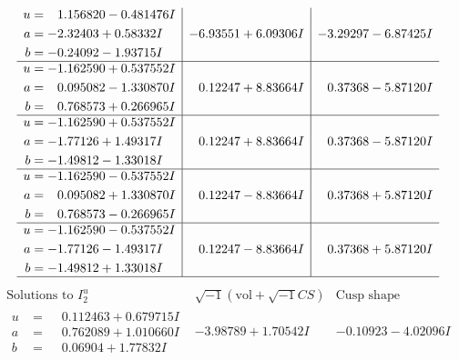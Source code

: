\documentclass[1p]{elsarticle_modified}
\theoremstyle{definition}
\newcommand{\I}{\sqrt{-1}}
\begin{document}
$$\begin{array}{c|c|c}
\begin{aligned}
u &= \phantom{-}1.156820 - 0.481476 I \\
a &= -2.32403 + 0.58332 I \\
b &= -0.24092 - 1.93715 I\end{aligned}
 & -6.93551 + 6.09306 I & -3.29297 - 6.87425 I \\ \hline\begin{aligned}
u &= -1.162590 + 0.537552 I \\
a &= \phantom{-}0.095082 - 1.330870 I \\
b &= \phantom{-}0.768573 + 0.266965 I\end{aligned}
 & \phantom{-}0.12247 + 8.83664 I & \phantom{-}0.37368 - 5.87120 I \\ \hline\begin{aligned}
u &= -1.162590 + 0.537552 I \\
a &= -1.77126 + 1.49317 I \\
b &= -1.49812 - 1.33018 I\end{aligned}
 & \phantom{-}0.12247 + 8.83664 I & \phantom{-}0.37368 - 5.87120 I \\ \hline\begin{aligned}
u &= -1.162590 - 0.537552 I \\
a &= \phantom{-}0.095082 + 1.330870 I \\
b &= \phantom{-}0.768573 - 0.266965 I\end{aligned}
 & \phantom{-}0.12247 - 8.83664 I & \phantom{-}0.37368 + 5.87120 I \\ \hline\begin{aligned}
u &= -1.162590 - 0.537552 I \\
a &= -1.77126 - 1.49317 I \\
b &= -1.49812 + 1.33018 I\end{aligned}
 & \phantom{-}0.12247 - 8.83664 I & \phantom{-}0.37368 + 5.87120 I\\
 \hline 
 \end{array}$$\newpage$$\begin{array}{c|c|c}  
\text{Solutions to }I^u_{2}& \I (\text{vol} + \sqrt{-1}CS) & \text{Cusp shape}\\
 \hline 
\begin{aligned}
u &= \phantom{-}0.112463 + 0.679715 I \\
a &= \phantom{-}0.762089 + 1.010660 I \\
b &= \phantom{-}0.06904 + 1.77832 I\end{aligned}
 & -3.98789 + 1.70542 I & -0.10923 - 4.02096 I \\ \hline\begin{aligned}

\end{aligned}
\end{array}$$
\end{document}
